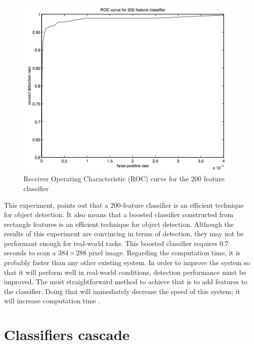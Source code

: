 \begin{figure}[!h]
\begin{center}
\noindent \includegraphics[scale=0.8]{figures/haar_feature_example_result} 
\newline
\caption{Receiver Operating Characteristic (ROC) curve for the 200 feature classifier \cite{VIO01}}
\label{haar_feature_example_result}
\end{center} 
\end{figure}

\noindent This experiment, points out that a 200-feature classifier is an efficient technique for object detection. It also means that a boosted classifier constructed from rectangle features is an efficient technique for object detection. Although the results of this experiment are convincing in terms of detection, they may not be performant enough for real-world tasks. This boosted classifier requires 0.7 seconds to scan a $ 384\times288 $ pixel image. Regarding the computation time, it is probably faster than any other existing system. In order to improve the system so that it will perform well in real-world conditions, detection performance must be improved. The most straightforward method to achieve that is to add features to the classifier. Doing that will immediately decrease the speed of this system; it will increase computation time \cite{VIO01}.
\newline

\section{Classifiers cascade}

